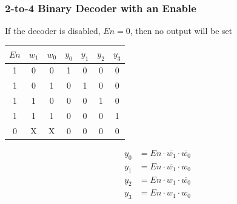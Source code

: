 \documentclass[12pt,openany]{book}
\begin{document}
\subsubsection{2-to-4 Binary Decoder with an Enable}

\begin{minipage}[htp]{0.45\textwidth}
If the decoder is disabled, $En = 0$, then no output will be set\newline
\vspace*{5px}

\begin{center}
	    \begin{tabular}{|c|c|c||c|c|c|c|}
	        \hline
	        $En$ & $w_1$ & $w_0$ & $y_0$ & $y_1$ & $y_2$ & $y_3$ \\
	        \hline
	        1 & 0 & 0 & 1 & 0 & 0 & 0 \\
	        1 & 0 & 1 & 0 & 1 & 0 & 0 \\
	        1 & 1 & 0 & 0 & 0 & 1 & 0 \\
	        1 & 1 & 1 & 0 & 0 & 0 & 1 \\
	        0 & X & X & 0 & 0 & 0 & 0 \\
	        \hline
	    \end{tabular}
\end{center}

\begin{center}
		\begin{align*}
		y_0 &= En \cdot \overline{w_1} \cdot \overline{w_0} \\
		y_1 &= En \cdot \overline{w_1} \cdot w_0 \\
		y_2 &= En \cdot w_1 \cdot \overline{w_0} \\
		y_3 &= En \cdot w_1 \cdot w_0
		\end{align*}
\end{center}
\end{minipage} \hfill\vline\hfill
\end{document}
